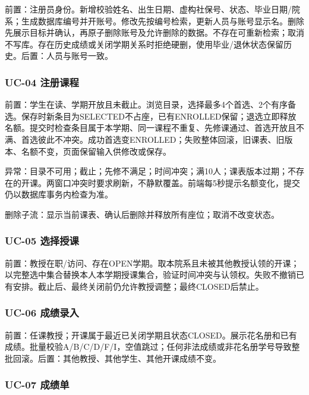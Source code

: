 \documentclass[UTF8,11pt,a4paper]{ctexart}
\begin{document}
前置：注册员身份。新增校验姓名、出生日期、虚构社保号、状态、毕业日期/院系；生成数据库编号并开账号。修改先按编号检索，更新人员与账号显示名。删除先展示目标并确认，再原子删除账号及允许删除的数据。不存在可重新检索；取消不写库。存在历史成绩或关闭学期关系时拒绝硬删，使用毕业/退休状态保留历史。后置：人员与账号一致。

\hypertarget{uc-04-ux6ce8ux518cux8bfeux7a0b}{%
\subsubsection{UC-04 注册课程}\label{uc-04-ux6ce8ux518cux8bfeux7a0b}}

前置：学生在读、学期开放且未截止。浏览目录，选择最多4个首选、2个有序备选。保存时新条目为SELECTED不占座，已有ENROLLED保留；退选立即释放名额。提交时检查条目属于本学期、同一课程不重复、先修课通过、首选开放且不满、首选彼此不冲突。成功首选变ENROLLED；失败整体回滚，旧课表、旧版本、名额不变，页面保留输入供修改或保存。

异常：目录不可用；截止；先修不满足；时间冲突；满10人；课表版本过期；不存在的开课。两窗口冲突时要求刷新，不静默覆盖。前端每5秒提示名额变化，提交仍以数据库事务内检查为准。

删除子流：显示当前课表、确认后删除并释放所有座位；取消不改变状态。

\hypertarget{uc-05-ux9009ux62e9ux6388ux8bfe}{%
\subsubsection{UC-05 选择授课}\label{uc-05-ux9009ux62e9ux6388ux8bfe}}

前置：教授在职/访问、存在OPEN学期。取本院系且未被其他教授认领的开课；以完整选中集合替换本人本学期授课集合，验证时间冲突与认领权。失败不撤销已有安排。截止后、最终关闭前仍允许教授调整；最终CLOSED后禁止。

\hypertarget{uc-06-ux6210ux7ee9ux5f55ux5165}{%
\subsubsection{UC-06 成绩录入}\label{uc-06-ux6210ux7ee9ux5f55ux5165}}

前置：任课教授；开课属于最近已关闭学期且状态CLOSED。展示花名册和已有成绩。批量校验A/B/C/D/F/I，空值跳过；任何非法成绩或非花名册学号导致整批回滚。后置：其他教授、其他学生、其他开课成绩不变。

\hypertarget{uc-07-ux6210ux7ee9ux5355}{%
\subsubsection{UC-07 成绩单}\label{uc-07-ux6210ux7ee9ux5355}}
\end{document}
